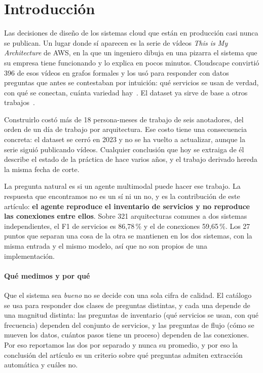\documentclass[a4paper, twocolumn, 10pt]{IEEEtran}
\begin{document}
 
 
\section{Introducción}
 
Las decisiones de diseño de los sistemas cloud que están en producción casi nunca
se publican. Un lugar donde sí aparecen es la serie de vídeos \emph{This is My
Architecture} de AWS, en la que un ingeniero dibuja en una pizarra el sistema que
su empresa tiene funcionando y lo explica en pocos minutos. Cloudscape convirtió
396 de esos vídeos en grafos formales y los usó para responder con datos
preguntas que antes se contestaban por intuición: qué servicios se usan de
verdad, con qué se conectan, cuánta variedad hay~\cite{satija2025cloudscape}. El
dataset ya sirve de base a otros trabajos~\cite{santillan2025hpc}.
 
Construirlo costó más de 18 persona-meses de trabajo de seis anotadores, del
orden de un día de trabajo por arquitectura. Ese costo tiene una consecuencia
concreta: el dataset se cerró en 2023 y no se ha vuelto a actualizar, aunque la
serie siguió publicando vídeos. Cualquier conclusión que hoy se extraiga de él
describe el estado de la práctica de hace varios años, y el trabajo derivado
hereda la misma fecha de corte.
 
La pregunta natural es si un agente multimodal puede hacer ese trabajo. La
respuesta que encontramos no es un sí ni un no, y es la contribución de este
artículo: \textbf{el agente reproduce el inventario de servicios y no reproduce
las conexiones entre ellos}. Sobre 321 arquitecturas comunes a dos sistemas
independientes, el F1 de servicios es 86,78\,\% y el de conexiones 59,65\,\%. Los
27 puntos que separan una cosa de la otra se mantienen en los dos sistemas, con
la misma entrada y el mismo modelo, así que no son propios de una implementación.
 
\paragraph{Qué medimos y por qué} Que el sistema sea \emph{bueno} no se decide
con una sola cifra de calidad. El catálogo se usa para responder dos clases de
preguntas distintas, y cada una depende de una magnitud distinta: las preguntas
de inventario (qué servicios se usan, con qué frecuencia) dependen del conjunto
de servicios, y las preguntas de flujo (cómo se mueven los datos, cuántos pasos
tiene un proceso) dependen de las conexiones. Por eso reportamos las dos por
separado y nunca su promedio, y por eso la conclusión del artículo es un criterio
sobre qué preguntas admiten extracción automática y cuáles no.
 
\end{document}
